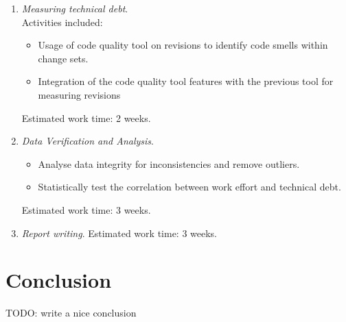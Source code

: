 \documentclass{mprop}
\begin{document}
\begin{enumerate}
	\item \textit{Measuring technical debt}.\\
	Activities included:
	\begin{itemize}
		\item Usage of code quality tool on revisions to identify code smells
		within change sets.
		\item Integration of the code quality tool features with the previous
		tool for measuring revisions 
	\end{itemize}

	Estimated work time: 2 weeks.\\

	\item \textit{Data Verification and Analysis}.\\
	\begin{itemize}
		\item Analyse data integrity for inconsistencies and remove outliers.
		\item Statistically test the correlation between work effort and technical debt.
	\end{itemize}

	Estimated work time: 3 weeks.\\

	\item \textit{Report writing}.
	Estimated work time: 3 weeks.\\

\end{enumerate}


\section{Conclusion}

TODO: write a nice conclusion

\pagebreak


\end{document}
